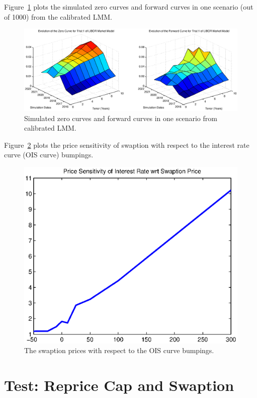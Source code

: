 Figure~\ref{fig::sim_zero_forward} plots the simulated zero curves and forward curves in one scenario (out of 1000) from the calibrated LMM.

\begin{center}
  \begin{figure}
      \includegraphics[scale=0.6]{sim_zero_forward.eps}
      \caption{Simulated zero curves and forward curves in one scenario from calibrated LMM.}\label{fig::sim_zero_forward}
  \end{figure}
\end{center}

Figure~\ref{fig::swaption_prices} plots the price sensitivity of swaption with respect to the interest rate curve (OIS curve) bumpings. 

\begin{center}
  \begin{figure}
      \includegraphics[scale=0.6]{swaption_prices.eps}
      \caption{The swaption prices with respect to the OIS curve bumpings.}\label{fig::swaption_prices}
  \end{figure}
\end{center}

\section{Test: Reprice Cap and Swaption} 